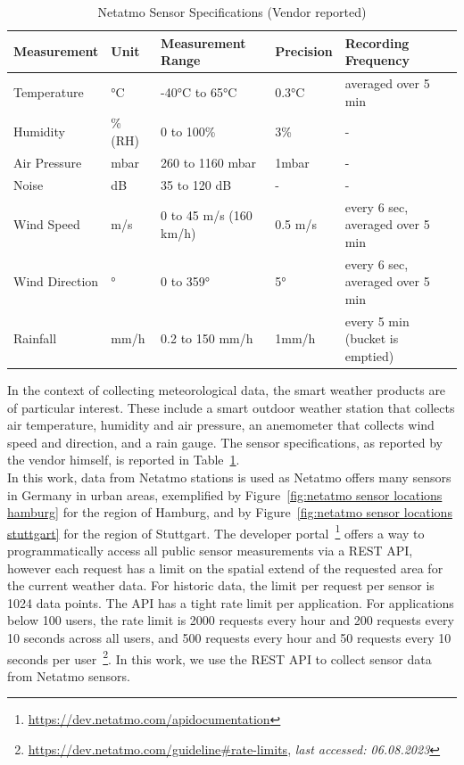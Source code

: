 \begin{table}[]
\begin{tabular}{@{}lllll@{}}
\toprule
Measurement    & Unit    & Measurement Range      & Precision  & Recording Frequency              \\ \midrule
Temperature    & °C      & -40°C to 65°C          & 0.3°C   & averaged over 5 min              \\
Humidity       & \% (RH) & 0 to 100\%             & 3\%     & -                                \\
Air Pressure   & mbar    & 260 to 1160 mbar       & 1mbar   & -                                \\
Noise          & dB      & 35 to 120 dB           & -       & -                                \\
Wind Speed     & m/s     & 0 to 45 m/s (160 km/h) & 0.5 m/s & every 6 sec, averaged over 5 min \\
Wind Direction & °       & 0 to 359°              & 5°      & every 6 sec, averaged over 5 min \\
Rainfall       & mm/h    & 0.2 to 150 mm/h        & 1mm/h   & every 5 min (bucket is emptied)  \\ \bottomrule
\end{tabular}
\caption{Netatmo Sensor Specifications (Vendor reported)}
\label{tab: netatmo sensor specs}
\end{table}

In the context of collecting meteorological data, the smart weather products are of particular interest. These include a smart outdoor weather station that collects air temperature, humidity and air pressure, an anemometer that collects wind speed and direction, and a rain gauge. The sensor specifications, as reported by the vendor himself, is reported in Table~\ref{tab: netatmo sensor specs}.\\
In this work, data from Netatmo stations is used as Netatmo offers many sensors in Germany in urban areas, exemplified by Figure~\ref{fig:netatmo sensor locations hamburg} for the region of Hamburg, and by Figure~\ref{fig:netatmo sensor locations stuttgart} for the region of Stuttgart.
The developer portal~\footnote{\url{https://dev.netatmo.com/apidocumentation}} offers a way to programmatically access all public sensor measurements via a REST API, however each request has a limit on the spatial extend of the requested area for the current weather data. For historic data, the limit per request per sensor is 1024 data points. The API has a tight rate limit per application. For applications below 100 users, the rate limit is 2000 requests every hour and 200 requests every 10 seconds across all users, and 500 requests every hour and 50 requests every 10 seconds per user~\footnote{\url{https://dev.netatmo.com/guideline\#rate-limits}, \textit{last accessed: 06.08.2023}}. In this work, we use the REST API to collect sensor data from Netatmo sensors.

